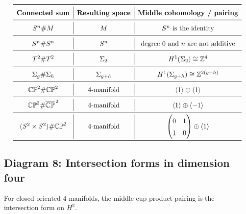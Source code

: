 \documentclass[12pt,a4paper]{article}
\theoremstyle{notespace}
\begin{document}
\[
\renewcommand{\arraystretch}{1.45}
\begin{array}{c|c|c}
	\toprule
	\textbf{Connected sum} & \textbf{Resulting space} & \textbf{Middle cohomology / pairing} \\
	\midrule
	S^n\#M
	&
	M
	&
	\text{\(S^n\) is the identity}
	\\
	\midrule
	S^n\#S^n
	&
	S^n
	&
	\text{degree \(0\) and \(n\) are not additive}
	\\
	\midrule
	T^2\#T^2
	&
	\Sigma_2
	&
	H^1(\Sigma_2)\cong \mathbb Z^4
	\\
	\midrule
	\Sigma_g\#\Sigma_h
	&
	\Sigma_{g+h}
	&
	H^1(\Sigma_{g+h})\cong \mathbb Z^{2(g+h)}
	\\
	\midrule
	\mathbb{CP}^2\#\mathbb{CP}^2
	&
	4\text{-manifold}
	&
	\langle 1\rangle\oplus\langle 1\rangle
	\\
	\midrule
	\mathbb{CP}^2\#\overline{\mathbb{CP}}^{\,2}
	&
	4\text{-manifold}
	&
	\langle 1\rangle\oplus\langle -1\rangle
	\\
	\midrule
	(S^2\times S^2)\#\mathbb{CP}^2
	&
	4\text{-manifold}
	&
	\begin{pmatrix}
		0&1\\
		1&0
	\end{pmatrix}
	\oplus
	\langle 1\rangle
	\\
	\bottomrule
\end{array}
\]

\subsection{Diagram 8: Intersection forms in dimension four}

For closed oriented \(4\)-manifolds, the middle cup product pairing is the
intersection form on \(H^2\).
\end{document}
